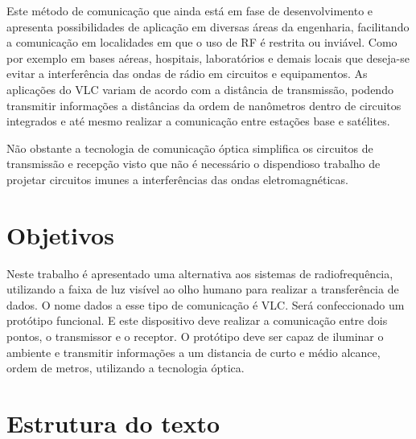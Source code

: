 Este método de comunicação que ainda está em fase de desenvolvimento e apresenta possibilidades de aplicação em diversas áreas da engenharia, facilitando a comunicação em localidades em que o uso de RF é restrita ou inviável. Como  por exemplo em bases aéreas,  hospitais, laboratórios e demais locais que deseja-se evitar a interferência das ondas de rádio em circuitos e equipamentos.
As aplicações do VLC variam de acordo com a distância de transmissão, podendo transmitir informações a distâncias da ordem de nanômetros dentro de circuitos integrados e até mesmo realizar a comunicação entre estações base e satélites. 

Não obstante a tecnologia de comunicação óptica simplifica os circuitos de transmissão e recepção visto que não é necessário o dispendioso trabalho de projetar circuitos imunes a interferências das ondas eletromagnéticas.\cite{Hranilovic}


\section{Objetivos}

Neste trabalho é apresentado uma alternativa aos sistemas de radiofrequência, utilizando a faixa de luz visível ao olho humano para realizar a transferência de dados. O nome dados a esse tipo de comunicação  é VLC.
Será confeccionado um protótipo funcional. E este dispositivo deve realizar a comunicação entre dois pontos, o transmissor e o receptor. O protótipo deve ser capaz de iluminar o ambiente e transmitir informações a um distancia de curto e médio alcance, ordem de metros, utilizando a tecnologia óptica.



\section{Estrutura do texto}

